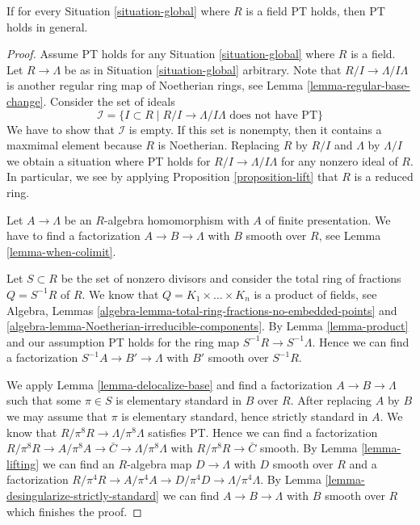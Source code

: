 \begin{lemma}
\label{lemma-reduce-to-field}
If for every Situation \ref{situation-global} where $R$
is a field PT holds, then PT holds in general.
\end{lemma}

\begin{proof}
Assume PT holds for any Situation \ref{situation-global} where $R$ is a field.
Let $R \to \Lambda$ be as in Situation \ref{situation-global} arbitrary.
Note that $R/I \to \Lambda/I\Lambda$ is another regular ring map
of Noetherian rings, see Lemma \ref{lemma-regular-base-change}.
Consider the set of ideals
$$
\mathcal{I} = \{I \subset R \mid R/I \to \Lambda/I\Lambda
\text{ does not have PT}\}
$$
We have to show that $\mathcal{I}$ is empty. If this set is nonempty,
then it contains a maxmimal element because $R$ is Noetherian.
Replacing $R$ by $R/I$ and $\Lambda$ by $\Lambda/I$ we obtain a
situation where PT holds for $R/I \to \Lambda/I\Lambda$ for any
nonzero ideal of $R$. In particular, we see by applying
Proposition \ref{proposition-lift}
that $R$ is a reduced ring.

\medskip\noindent
Let $A \to \Lambda$ be an $R$-algebra homomorphism with $A$ of
finite presentation. We have to find a factorization $A \to B \to \Lambda$
with $B$ smooth over $R$, see Lemma \ref{lemma-when-colimit}.

\medskip\noindent
Let $S \subset R$ be the set of nonzero divisors and
consider the total ring of fractions $Q = S^{-1}R$ of $R$. We know that
$Q = K_1 \times \ldots \times K_n$ is a product of fields, see
Algebra, Lemmas \ref{algebra-lemma-total-ring-fractions-no-embedded-points} and
\ref{algebra-lemma-Noetherian-irreducible-components}.
By Lemma \ref{lemma-product} and our assumption
PT holds for the ring map $S^{-1}R \to S^{-1}\Lambda$.
Hence we can find a factorization $S^{-1}A \to B' \to \Lambda$
with $B'$ smooth over $S^{-1}R$.

\medskip\noindent
We apply Lemma \ref{lemma-delocalize-base}
and find a factorization $A \to B \to \Lambda$ such that
some $\pi \in S$ is elementary standard in $B$ over $R$.
After replacing $A$ by $B$ we may assume that $\pi$ is
elementary standard, hence strictly standard in $A$. We know that
$R/\pi^8R \to \Lambda/\pi^8\Lambda$ satisfies PT.
Hence we can find a factorization
$R/\pi^8 R \to A/\pi^8A \to \bar C \to \Lambda/\pi^8\Lambda$
with $R/\pi^8 R \to \bar C$ smooth. By
Lemma \ref{lemma-lifting}
we can find an $R$-algebra map $D \to \Lambda$ with $D$ smooth over $R$
and a factorization
$R/\pi^4 R \to A/\pi^4A \to D/\pi^4D \to \Lambda/\pi^4\Lambda$.
By Lemma \ref{lemma-desingularize-strictly-standard}
we can find $A \to B \to \Lambda$ with $B$ smooth over $R$
which finishes the proof.
\end{proof}










